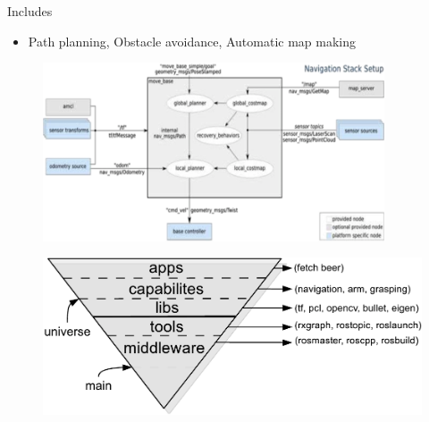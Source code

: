 \lyxframeend{}


\lyxframeend{}

Includes
\begin{itemize}
\item Path planning, Obstacle avoidance, Automatic map making
\end{itemize}
\noindent \begin{center}
\begin{figure}[H]
\noindent \centering{}\includegraphics[width=0.9\textwidth]{images/ROSNavigation}
\end{figure}

\par\end{center}


\lyxframeend{}


\lyxframeend{}

\noindent \begin{center}
\begin{figure}[H]
\noindent \centering{}\includegraphics[width=1\textwidth]{images/ROSEcosystem}
\end{figure}

\par\end{center}

